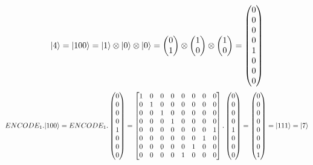 \documentclass[11pt,oneside,a4paper]{article}
\begin{document}
\begin{equation}
    {\left\vert{4}\right\rangle} = {\left\vert{100}\right\rangle} = {\left\vert{1}\right\rangle} \otimes {\left\vert{0}\right\rangle} \otimes {\left\vert{0}\right\rangle} = \begin{pmatrix}0\\1\end{pmatrix} \otimes \begin{pmatrix}1\\0\end{pmatrix} \otimes \begin{pmatrix}1\\0\end{pmatrix} = \begin{pmatrix}0\\0\\0\\0\\1\\0\\0\\0\end{pmatrix}
\end{equation}
\begin{equation}
    ENCODE_1 . {\left\vert{100}\right\rangle} = ENCODE_1 .
    \begin{pmatrix}0\\0\\0\\0\\1\\0\\0\\0\end{pmatrix} = 
    \begin{bmatrix}
    1 & 0 & 0 & 0 & 0 & 0 & 0 & 0\\
    0 & 1 & 0 & 0 & 0 & 0 & 0 & 0\\
    0 & 0 & 1 & 0 & 0 & 0 & 0 & 0\\
    0 & 0 & 0 & 1 & 0 & 0 & 0 & 0\\
    0 & 0 & 0 & 0 & 0 & 0 & 0 & 1\\
    0 & 0 & 0 & 0 & 0 & 0 & 1 & 0\\
    0 & 0 & 0 & 0 & 0 & 1 & 0 & 0\\
    0 & 0 & 0 & 0 & 1 & 0 & 0 & 0
    \end{bmatrix} . \begin{pmatrix}0\\0\\0\\0\\1\\0\\0\\0\end{pmatrix}
    = \begin{pmatrix}0\\0\\0\\0\\0\\0\\0\\1\end{pmatrix} = {\left\vert{111}\right\rangle} = {\left\vert{7}\right\rangle}
    \label{eq:simple_encode_100}
\end{equation}
\end{document}
